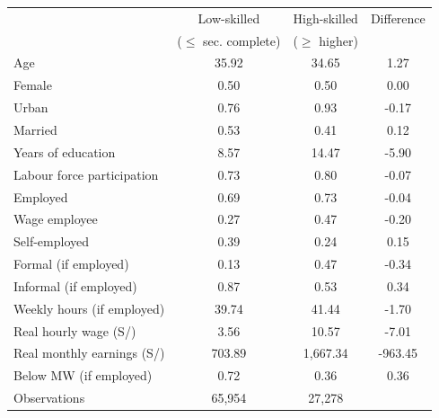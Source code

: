 \begin{tabular}{lccc}
\toprule
 & Low-skilled & High-skilled & Difference \\
 & ($\le$ sec. complete) & ($\ge$ higher) & \\
\midrule
Age & 35.92 & 34.65 & 1.27 \\
Female & 0.50 & 0.50 & 0.00 \\
Urban & 0.76 & 0.93 & -0.17 \\
Married & 0.53 & 0.41 & 0.12 \\
Years of education & 8.57 & 14.47 & -5.90 \\
Labour force participation & 0.73 & 0.80 & -0.07 \\
Employed & 0.69 & 0.73 & -0.04 \\
Wage employee & 0.27 & 0.47 & -0.20 \\
Self-employed & 0.39 & 0.24 & 0.15 \\
Formal (if employed) & 0.13 & 0.47 & -0.34 \\
Informal (if employed) & 0.87 & 0.53 & 0.34 \\
Weekly hours (if employed) & 39.74 & 41.44 & -1.70 \\
Real hourly wage (S/) & 3.56 & 10.57 & -7.01 \\
Real monthly earnings (S/) & 703.89 & 1,667.34 & -963.45 \\
Below MW (if employed) & 0.72 & 0.36 & 0.36 \\
\midrule
Observations & 65,954 & 27,278 & \\
\bottomrule
\end{tabular}
